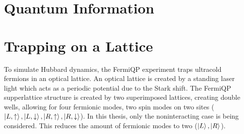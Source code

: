 \section{Quantum Information}

\section{Trapping on a Lattice}
To simulate Hubbard dynamics, the FermiQP experiment traps ultracold fermions in an optical lattice.
An optical lattice is created by a standing laser light which acts as a periodic potential due to the Stark shift. The FermiQP supperlattice structure is created by two superimposed lattices, creating double wells, allowing for four fermionic modes, two spin modes on two sites ($\ket{L,\uparrow},\ket{L,\downarrow},\ket{R,\uparrow},\ket{R,\downarrow}$). In this thesis, only the noninteracting case is being considered. This reduces the amount of fermionic modes to two ($\ket{L}, \ket{R}$).


